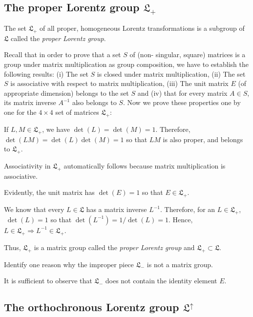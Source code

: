 \begin{small}
\subsection{The proper Lorentz group 
{$\mathfrak{L}_+$}{}}

\lem The set $\mathfrak{L}_+$ of all proper, homogeneous  
Lorentz transformations is a subgroup of $\mathfrak{L}$ 
called the  \textsl{proper Lorentz group}.

\prf Recall that in order to prove that a set $S$ of (non-  
singular, square) matrices is a group under matrix 
multiplication as group composition, we have to establish 
the following results:
(i) The set $S$ is {closed} under matrix multiplication, 
(ii) The set $S$ is {associative} with respect to matrix 
multiplication,
(iii) The unit matrix $E$ (of appropriate dimension) 
belongs 
to the set $S$ and (iv) that for every matrix $A\in S$, its 
matrix inverse $A^{-1}$ also belongs to $S$. Now we prove 
these properties one by one for the  $4\times 4$ set of 
matrices $\mathfrak{L}_+$:

 If $L,M\in\mathfrak{L}_+$, we have $ 
\det(L)=\det(M)=1$. Therefore, $\det(LM) =\det(L)\det(M)=1$ 
so that $LM$ is also proper, and belongs to 
$\mathfrak{L}_+$.

Associativity in  $\mathfrak{L}_+$
automatically follows because matrix multiplication is
associative.

Evidently, the unit matrix has $\det(E)=1$ 
so that $E\in\mathfrak{L}_+$.

 We know that every $L\in \mathfrak{L}$ has 
a matrix inverse $L^{-1}$. Therefore, for an 
$L\in\mathfrak{L}_+$, $\;\det(L)=1 $ so that $\det(L^{-1}) 
=1/ \det(L)=1 $. Hence, $L\in \mathfrak{L}_+ \Rightarrow 
L^{-1}\in \mathfrak{L}_+$.

Thus, $\mathfrak{L}_+$ is a matrix group called the
\textsl{proper Lorentz group} and $\mathfrak{L}_+\subset
\mathfrak{L}$.

\exm Identify one reason why the improper piece 
$\mathfrak{L}_-$ is not a matrix group.

\soln It is sufficient to observe that  $\mathfrak{L}_-$ 
does not contain the identity element $E$.\ebx 

\subsection{The orthochronous Lorentz 
group {$\mathfrak{L}^\uparrow$}{}}


\end{small}
